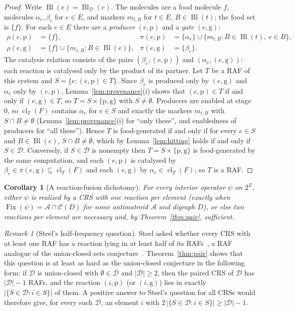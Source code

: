 \documentclass[11pt,a4paper]{article}
\theoremstyle{plain}
\newtheorem{corollary}[theorem]{Corollary}
\theoremstyle{definition}
\theoremstyle{remark}
\newtheorem{remark}[theorem]{Remark}
\newcommand{\Fix}{\operatorname{Fix}}
\newcommand{\cl}{\operatorname{cl}}
\newcommand{\Bl}{\operatorname{Bl}}
\newcommand{\cA}{\mathcal{A}}
\newcommand{\cC}{\mathcal{C}}
\newcommand{\cD}{\mathcal{D}}
\newcommand{\pw}[1]{2^{#1}}
\begin{document}
\begin{proof}
Write $\Bl(e)=\Bl_{\cD}(e)$. The molecules are a food molecule $f$, molecules $\alpha_e,\beta_e$ for $e\in E$, and markers $m_{t,B}$ for $t\in E$, $B\in\Bl(t)$; the food set is $\{f\}$. For each $e\in E$ there are a \emph{producer} $(e,\mathrm{p})$ and a \emph{gate} $(e,\mathrm{g})$:
\begin{align*}
\rho(e,\mathrm{p})&=\{f\}, & \pi(e,\mathrm{p})&=\{\alpha_e\}\cup\{m_{t,B}: B\in\Bl(t),\ e\in B\},\\
\rho(e,\mathrm{g})&=\{f\}\cup\{m_{e,B}:B\in\Bl(e)\}, & \pi(e,\mathrm{g})&=\{\beta_e\}.
\end{align*}
The catalysis relation consists of the pairs $(\beta_e,(e,\mathrm{p}))$ and $(\alpha_e,(e,\mathrm{g}))$: each reaction is catalysed only by the product of its partner. Let $T$ be a RAF of this system and $S=\{e:(e,\mathrm{p})\in T\}$. Since $\beta_e$ is produced only by $(e,\mathrm{g})$ and $\alpha_e$ only by $(e,\mathrm{p})$, Lemma~\ref{lem:provenance}(i) shows that $(e,\mathrm{p})\in T$ if and only if $(e,\mathrm{g})\in T$, so $T=S\times\{\mathrm{p},\mathrm{g}\}$ with $S\neq\emptyset$. Producers are enabled at stage $0$, so $\cl_T(F)$ contains $\alpha_e$ for $e\in S$ and exactly the markers $m_{t,B}$ with $S\cap B\neq\emptyset$ (Lemma~\ref{lem:provenance}(i) for ``only these'', and enabledness of producers for ``all these''). Hence $T$ is food-generated if and only if for every $e\in S$ and $B\in\Bl(e)$, $S\cap B\neq\emptyset$, which by Lemma~\ref{lem:hitting} holds if and only if $S\in\cD$. Conversely, if $S\in\cD$ is nonempty then $T=S\times\{\mathrm{p},\mathrm{g}\}$ is food-generated by the same computation, and each $(e,\mathrm{p})$ is catalysed by $\beta_e\in\pi(e,\mathrm{g})\subseteq\cl_T(F)$ and each $(e,\mathrm{g})$ by $\alpha_e\in\cl_T(F)$; so $T$ is a RAF.
\end{proof}

\begin{corollary}[A reaction-fusion dichotomy]
For every interior operator $\psi$ on $\pw{E}$, either $\psi$ is realized by a CRS with one reaction per element (exactly when $\Fix(\psi)=\cA\cap\cC(D)$ for some antimatroid $\cA$ and digraph $D$), or else two reactions per element are necessary and, by Theorem~\ref{thm:pair}, sufficient.
\end{corollary}

\begin{remark}[Steel's half-frequency question]
Steel asked whether every CRS with at least one RAF has a reaction lying in at least half of its RAFs~\cite[Section~4]{steel2023interior}, a RAF analogue of the union-closed sets conjecture~\cite{balla2013union,gilmer2022constant}. Theorem~\ref{thm:pair} shows that this question is at least as hard as the union-closed conjecture in the following form: if $\cD$ is union-closed with $\emptyset\in\cD$ and $|\cD|\ge2$, then the paired CRS of $\cD$ has $|\cD|-1$ RAFs, and the reaction $(i,\mathrm{p})$ (or $(i,\mathrm{g})$) lies in exactly $|\{S\in\cD:i\in S\}|$ of them. A positive answer to Steel's question for all CRSs would therefore give, for every such $\cD$, an element $i$ with $2\,|\{S\in\cD:i\in S\}|\ge|\cD|-1$.
\end{remark}
\end{document}
